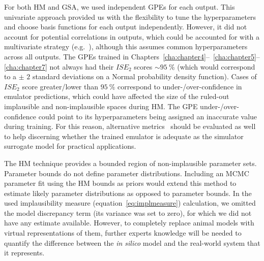 \vspace{0.2cm}
For both HM and GSA, we used independent GPEs for each output. This univariate approach provided us with the flexibility to tune the hyperparameters and choose basis functions for each output independently. However, it did not account for potential correlations in outputs, which could be accounted for with a multivariate strategy (e.g.~\cite{Conti:2009}), although this assumes common hyperparameters across all outputs. The GPEs trained in Chapters~\ref{cha:chapter4}--~\ref{cha:chapter5}--\ref{cha:chapter7} not always had their $ISE_2$ scores $\sim\SI{95}{\percent}$ (which would correspond to a $\pm$ $2$ standard deviations on a Normal probability density function). Cases of $ISE_2$ score greater/lower than $\SI{95}{\percent}$ correspond to under-/over-confidence in emulator predictions, which could have affected the size of the ruled-out implausible and non-implausible spaces during HM. The GPE under-/over- confidence could point to its hyperparameters being assigned an inaccurate value during training. For this reason, alternative metrics~\cite{Bastos:2009} should be evaluated as well to help discerning whether the trained emulator is adequate as the simulator surrogate model for practical applications.

\vspace{0.2cm}
The HM technique provides a bounded region of non-implausible parameter sets. Parameter bounds do not define parameter distributions. Including an MCMC parameter fit using the HM bounds as priors would extend this method to estimate likely parameter distributions as opposed to parameter bounds. In the used implausibility measure (equation~\eqref{eq:implmeasure}) calculation, we omitted the model discrepancy term (its variance was set to zero), for which we did not have any estimate available. However, to completely replace animal models with virtual representations of them, further experts knowledge will be needed to quantify the difference between the \textit{in silico} model and the real-world system that it represents.

